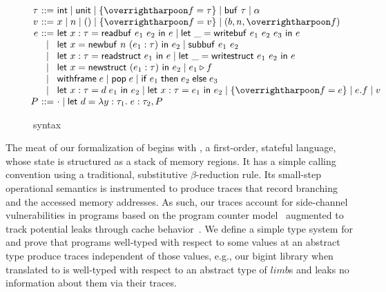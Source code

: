 \begin{figure}[t]
\vspace{-1em}
\begin{small}
\[\!\!\!\!\!
  \begin{array}{r@{~}c@{~}l@{}}
    \tau  & ::= & \kw{int} \mid \kw{unit} \mid \{\ls{\fd=\tau}\} \mid \kw{buf}~\tau \mid \alpha\\
    \lv   & ::= & x \mid n \mid () \mid \{\ls{\fd=\lv}\} \mid (b, n, \ls{\fd}) \\
    \lexp & ::= & \elet{x:\tau}{\ereadbuf {\lexp_1}{\lexp_2}}{\lexp} \mid \elet{\_}{\ewritebuf{\lexp_1}{\lexp_2}{\lexp_3}}{\lexp} \\
          & \mid &\elet{x}{\enewbuf{n}{(\lexp_1:\tau)}}{\lexp_2} \mid \esubbuf{\lexp_1}{\lexp_2}  \\
          & \mid & \elet{x:\tau}{\ereadstruct {\lexp_1}}{\lexp} \mid \elet{\_}{\ewritestruct{\lexp_1}{\lexp_2}}{\lexp} \\
          & \mid &\elet{x}{\enewstruct{(\lexp_1:\tau)}}{\lexp_2} \mid \estructfield{\lexp_1}{\fd}  \\
          & \mid &\withframe\;\lexp \mid \epop\;\lexp \mid \eif {\lexp_1}{\lexp_2}{\lexp_3} \\
          & \mid &\elet{x:\tau}{d\;\lexp_1}{\lexp_2} \mid \elet{x:\tau}{\lexp_1}{\lexp_2} \mid \{\ls{\fd=\lexp}\} \mid \lexp.\fd  \mid \lv \\
    \lp   & ::= &\cdot \mid \etlet{d}{\lambda y:\tau_1. \; \lexp : \tau_2}, \lp \\
\end{array} 
\]
\end{small}
\caption{\lamstar syntax}
\label{fig:lamstar-syntax}
\end{figure}

The meat of our formalization of \lowstar begins with \lamstar, a
first-order, stateful language, whose state is structured as a stack
of memory regions. It has a simple calling convention using a
traditional, substitutive $\beta$-reduction rule. Its small-step
operational semantics is instrumented to produce traces that record
branching and the accessed memory addresses. As such, our traces
account for side-channel vulnerabilities in programs based on the
program counter model~\cite{molnar05pcmodel} augmented to track
potential leaks through cache behavior~\cite{barthe-ccs2014}. We
define a simple type system for \lamstar and prove that programs
well-typed with respect to some values at an abstract type produce
traces independent of those values, e.g., our bigint library when
translated to \lamstar is well-typed with respect to an abstract type
of \lst$limb$s and leaks no information about them via their traces.

